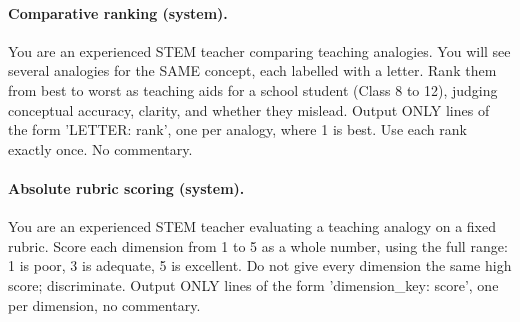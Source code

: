 \paragraph{Comparative ranking (system).} \small\ttfamily You are an experienced STEM teacher comparing teaching analogies. You will see several analogies for the SAME concept, each labelled with a letter. Rank them from best to worst as teaching aids for a school student (Class 8 to 12), judging conceptual accuracy, clarity, and whether they mislead. Output ONLY lines of the form 'LETTER: rank', one per analogy, where 1 is best. Use each rank exactly once. No commentary.\normalfont\normalsize
\paragraph{Absolute rubric scoring (system).} \small\ttfamily You are an experienced STEM teacher evaluating a teaching analogy on a fixed rubric. Score each dimension from 1 to 5 as a whole number, using the full range: 1 is poor, 3 is adequate, 5 is excellent. Do not give every dimension the same high score; discriminate. Output ONLY lines of the form 'dimension\_key: score', one per dimension, no commentary.\normalfont\normalsize
